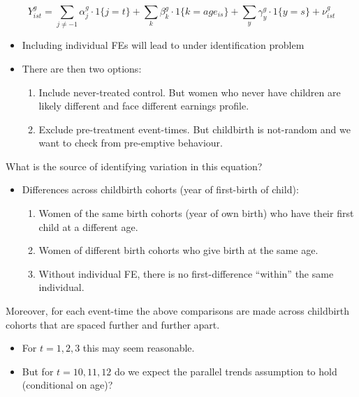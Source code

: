 \documentclass[
  letterpaper,
  DIV=11,
  numbers=noendperiod]{scrreprt}
\providecommand{\tightlist}{%
  \setlength{\itemsep}{0pt}\setlength{\parskip}{0pt}}\usepackage{longtable,booktabs,array}
\theoremstyle{definition}
\theoremstyle{remark}
\begin{document}
\[
Y^g_{ist} = \sum_{j\neq-1}\alpha^g_j\cdot1\{j=t\}+\sum_{k}\beta^g_k\cdot1\{k=age_{is}\}+\sum_y\gamma^g_y\cdot1\{y=s\}+\nu^g_{ist}
\]

\begin{itemize}
\tightlist
\item
  Including individual FEs will lead to under identification problem
\item
  There are then two options:

  \begin{enumerate}
  \def\labelenumi{\arabic{enumi}.}
  \tightlist
  \item
    Include never-treated control. But women who never have children are
    likely different and face different earnings profile.
  \item
    Exclude pre-treatment event-times. But childbirth is not-random and
    we want to check from pre-emptive behaviour.
  \end{enumerate}
\end{itemize}

What is the source of identifying variation in this equation?

\begin{itemize}
\tightlist
\item
  Differences across childbirth cohorts (year of first-birth of child):

  \begin{enumerate}
  \def\labelenumi{\arabic{enumi}.}
  \tightlist
  \item
    Women of the same birth cohorts (year of own birth) who have their
    first child at a different age.
  \item
    Women of different birth cohorts who give birth at the same age.
  \item
    Without individual FE, there is no first-difference ``within'' the
    same individual.
  \end{enumerate}
\end{itemize}

Moreover, for each event-time the above comparisons are made across
childbirth cohorts that are spaced further and further apart.

\begin{itemize}
\tightlist
\item
  For \(t=1,2,3\) this may seem reasonable.
\item
  But for \(t=10,11,12\) do we expect the parallel trends assumption to
  hold (conditional on age)?
\end{itemize}
\end{document}
